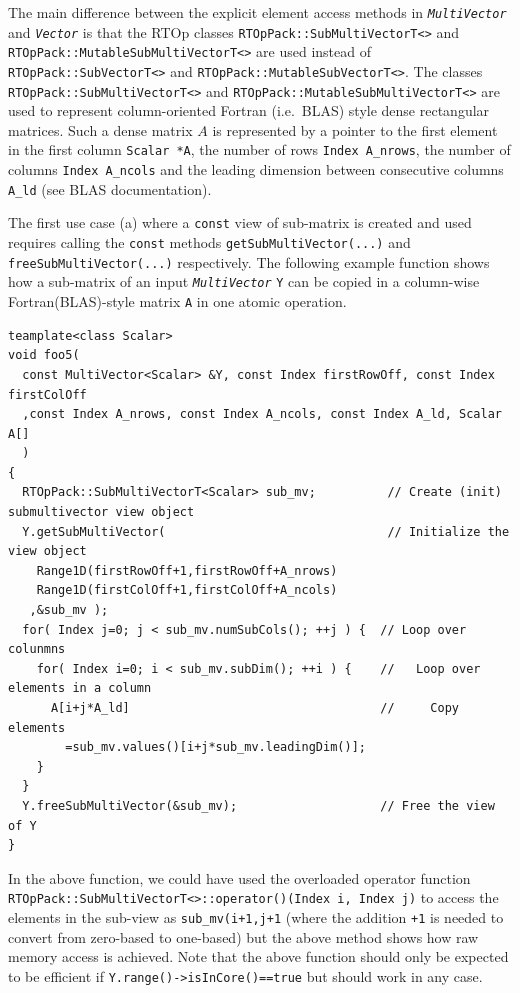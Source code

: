 The main difference between the explicit element access methods in
{}\texttt{\textit{Multi\-Vector}} and {}\texttt{\textit{Vector}} is
that the RTOp classes {}\texttt{RTOpPack::\-SubMultiVectorT<>} and
{}\texttt{RTOpPack::\-MutableSubMultiVectorT<>} are used instead of
{}\texttt{RTOpPack::\-SubVectorT<>} and
{}\texttt{RTOpPack::\-MutableSubVectorT<>}.  The classes
{}\texttt{RTOpPack::\-SubMultiVectorT<>} and
{}\texttt{RTOpPack::\-MutableSubMultiVectorT<>} are used to represent
column-oriented Fortran (i.e.~BLAS) style dense rectangular matrices.
Such a dense matrix $A$ is represented by a pointer to the first
element in the first column {}\texttt{Scalar *A}, the number of rows
{}\texttt{Index A\_nrows}, the number of columns {}\texttt{Index
A\_ncols} and the leading dimension between consecutive columns
{}\texttt{A\_ld} (see BLAS documentation).

The first use case (a) where a {}\texttt{const} view of sub-matrix is
created and used requires calling the {}\texttt{const} methods
{}\texttt{get\-Sub\-Multi\-Vector(...)} and
{}\texttt{free\-Sub\-Multi\-Vector(...)}  respectively.  The following
example function shows how a sub-matrix of an input
{}\texttt{\textit{Multi\-Vector}} {}\texttt{Y} can be copied in a
column-wise Fortran(BLAS)-style matrix {}\texttt{A} in one atomic
operation.

{\scriptsize\begin{verbatim}
teamplate<class Scalar>
void foo5(
  const MultiVector<Scalar> &Y, const Index firstRowOff, const Index firstColOff
  ,const Index A_nrows, const Index A_ncols, const Index A_ld, Scalar A[]
  )
{
  RTOpPack::SubMultiVectorT<Scalar> sub_mv;          // Create (init) submultivector view object
  Y.getSubMultiVector(                               // Initialize the view object
    Range1D(firstRowOff+1,firstRowOff+A_nrows)
    Range1D(firstColOff+1,firstColOff+A_ncols)
   ,&sub_mv );
  for( Index j=0; j < sub_mv.numSubCols(); ++j ) {  // Loop over colunmns
    for( Index i=0; i < sub_mv.subDim(); ++i ) {    //   Loop over elements in a column
      A[i+j*A_ld]                                   //     Copy elements
        =sub_mv.values()[i+j*sub_mv.leadingDim()];
    }
  }
  Y.freeSubMultiVector(&sub_mv);                    // Free the view of Y
}
\end{verbatim}}

In the above function, we could have used the overloaded operator
function
{}\texttt{RTOpPack::\-Sub\-Multi\-VectorT<>::\-operator()(Index i,
Index j)} to access the elements in the sub-view as
{}\texttt{sub\_mv(i+1,j+1} (where the addition {}\texttt{+1} is needed
to convert from zero-based to one-based) but the above method shows
how raw memory access is achieved.  Note that the above function
should only be expected to be efficient if
{}\texttt{Y.range()->isInCore()==true} but should work in any case.


